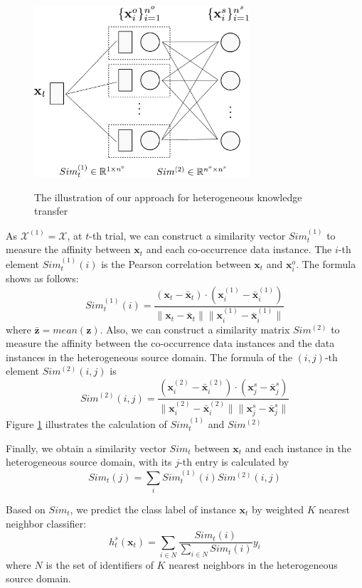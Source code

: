 \documentclass{article} %
\theoremstyle{remark}
\theoremstyle{definition}
\begin{document}
\begin{figure}[H]
\centering
  \includegraphics[width=8cm]{knowledgetransfer.pdf}
  \label{knowledgetransfer}
  \caption{The illustration of our approach for heterogeneous knowledge transfer}
\end{figure}

As $\mathcal{X}^{(1)} = \mathcal{X}$, at $t$-th trial, we can construct a similarity vector $Sim_{t}^{(1)}$ to measure the affinity between $\mathbf{x}_t$ and each co-occurrence data instance. 
The $i$-th element $Sim_{t}^{(1)}(i)$ is the Pearson correlation between $\mathbf{x}_t$ and $\mathbf{x}_{i}^{o}$.
The formula shows as follows:
$$ Sim_{t}^{(1)}(i) = \frac{(\mathbf{x}_t - \bar{\mathbf{x}}_t) \cdot (\mathbf{x}_{i}^{(1)} - \bar{\mathbf{x}}_{i}^{(1)})}{\| \mathbf{x}_t - \bar{\mathbf{x}}_t \| \| \mathbf{x}_{i}^{(1)} - \bar{\mathbf{x}}_{i}^{(1)} \|} $$
where $\bar{\mathbf{z}} = mean(\mathbf{z})$.
Also, we can construct a similarity matrix $Sim^{(2)}$ to measure the affinity between the co-occurrence data instances and the data instances in the heterogeneous source domain.
The formula of the $(i,j)$-th element $Sim^{(2)}(i,j)$ is
$$ Sim^{(2)}(i,j) = \frac{(\mathbf{x}_{i}^{(2)} - \bar{\mathbf{x}}_{i}^{(2)}) \cdot (\mathbf{x}_{j}^{s} - \bar{\mathbf{x}}_{j}^{s})}{\| \mathbf{x}_{i}^{(2)} - \bar{\mathbf{x}}_{i}^{(2)} \| \| \mathbf{x}_{j}^{s} - \bar{\mathbf{x}}_{j}^{s} \|} $$
Figure \ref{knowledgetransfer} illustrates the calculation of $Sim_{t}^{(1)}$ and $Sim^{(2)}$

Finally, we obtain a similarity vector $Sim_t$ between $\mathbf{x}_t$ and each instance in the heterogeneous source domain, with its $j$-th entry is calculated by 
$$ Sim_t(j) = \sum\limits_i Sim_{t}^{(1)}(i) Sim^{(2)}(i,j) $$

Based on $Sim_t$, we predict the class label of instance $\mathbf{x}_t$ by weighted $K$ nearest neighbor classifier:
$$ h_{t}^{s}(\mathbf{x}_t) = \sum\limits_{i \in N} \frac{Sim_t(i)}{\sum\limits_{i \in N} Sim_t(i)} y_i $$
where $N$ is the set of identifiers of $K$ nearest neighbors in the heterogeneous source domain.
\end{document}
